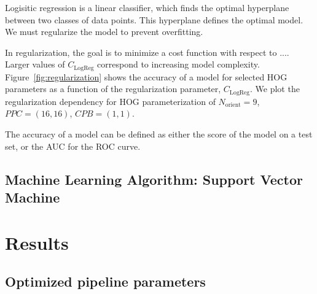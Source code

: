 \documentclass{emulateapj}
\begin{document}
Logisitic regression is a linear classifier, which finds the optimal
hyperplane between two classes of data points.  This hyperplane
defines the optimal model.  We must regularize the model to prevent
overfitting.  

In regularization, the goal is to minimize a cost function with
respect to ....  Larger values of $C_\text{LogReg}$ correspond to
increasing model complexity.  Figure~\ref{fig:regularization} shows
the accuracy of a model for selected HOG parameters as a function of
the regularization parameter, $C_\text{LogReg}$.  We plot the
regularization dependency for HOG parameterization of
$N_\text{orient}=9$, $PPC=(16, 16)$, $CPB=(1,1)$.  

The accuracy of a model can be defined as either the score of the
model on a test set, or the AUC for the ROC curve.



\subsection{Machine Learning Algorithm: Support Vector Machine}



\section{Results}
\label{sec:results}
\subsection{Optimized pipeline parameters}\label{sec:gridsearch}
\end{document}
